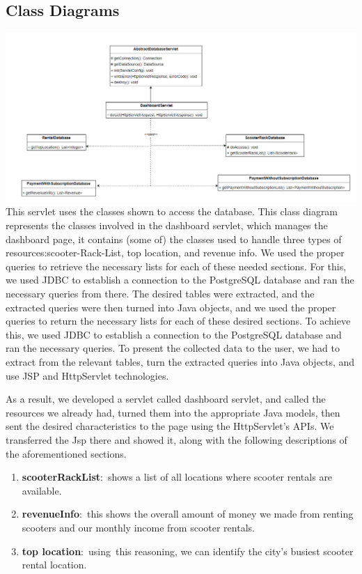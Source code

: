 \subsection{Class Diagrams}


\includegraphics[scale=0.5]{sections/DLL/dashboard-servlet_CD.png}
This servlet uses the classes shown to access the database. This class diagram represents the classes involved in the dashboard servlet, which manages the dashboard page, it contains (some of) the classes used to handle three types of resources:scooter-Rack-List, top location, and revenue info. We used the proper queries to retrieve the necessary lists for each of these needed sections. For this, we used JDBC to establish a connection to the PostgreSQL database and ran the necessary queries from there. The desired tables were extracted, and the extracted queries were then turned into Java objects, and we used the proper queries to return the necessary lists for each of these desired sections. To achieve this, we used JDBC to establish a connection to the PostgreSQL database and ran the necessary queries. To present the collected data to the user, we had to extract from the relevant tables, turn the extracted queries into Java objects, and use JSP and HttpServlet technologies. 

As a result, we developed a servlet called dashboard servlet, and called the resources we already had, turned them into the appropriate Java models, then sent the desired characteristics to the page using the HttpServlet's APIs. We transferred the Jsp there and showed it, along with the following descriptions of the aforementioned sections.

\begin{enumerate}
    \item \textbf{scooterRackList}: shows a list of all locations where scooter rentals are available.
    \item \textbf{revenueInfo}: this shows the overall amount of money we made from renting scooters and our monthly income from scooter rentals.
    \item \textbf{top location}: using this reasoning, we can identify the city's busiest scooter rental location.
\end{enumerate}

